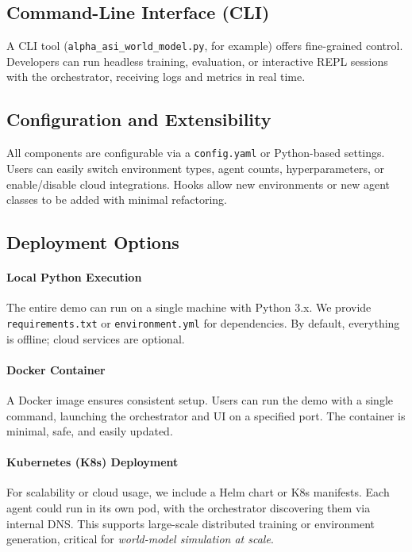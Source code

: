 \documentclass{article}
\begin{document}
\subsection{Command-Line Interface (CLI)}
A CLI tool (\texttt{alpha\_asi\_world\_model.py}, for example) offers fine-grained control. Developers can run headless training, evaluation, or interactive REPL sessions with the orchestrator, receiving logs and metrics in real time.

\subsection{Configuration and Extensibility}
All components are configurable via a \texttt{config.yaml} or Python-based settings. Users can easily switch environment types, agent counts, hyperparameters, or enable/disable cloud integrations. Hooks allow new environments or new agent classes to be added with minimal refactoring.

\subsection{Deployment Options}

\paragraph{Local Python Execution}
The entire demo can run on a single machine with Python 3.x. We provide \texttt{requirements.txt} or \texttt{environment.yml} for dependencies. By default, everything is offline; cloud services are optional.

\paragraph{Docker Container}
A Docker image ensures consistent setup. Users can run the demo with a single command, launching the orchestrator and UI on a specified port. The container is minimal, safe, and easily updated.

\paragraph{Kubernetes (K8s) Deployment}
For scalability or cloud usage, we include a Helm chart or K8s manifests. Each agent could run in its own pod, with the orchestrator discovering them via internal DNS. This supports large-scale distributed training or environment generation, critical for \emph{world-model simulation at scale}.
\end{document}
